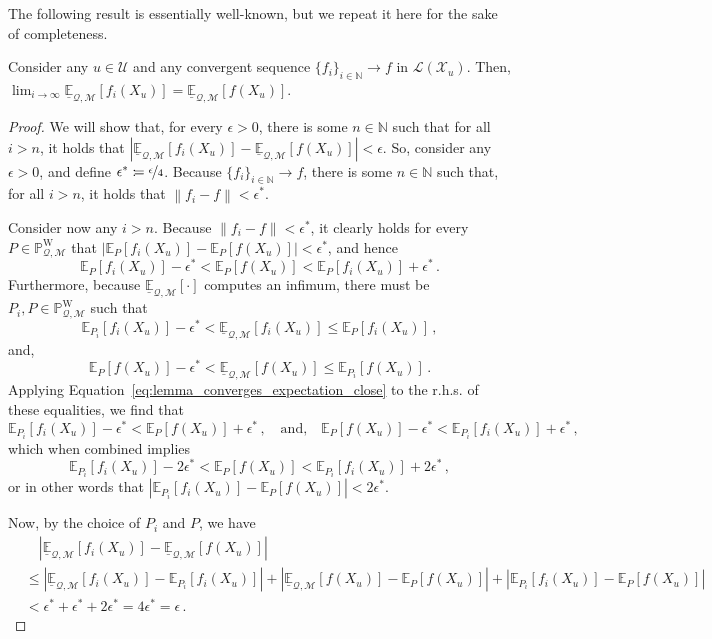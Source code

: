 \documentclass[twoside,11pt]{article}
\newcommand{\nats}{\mathbb{N}}
\newcommand{\states}{\mathcal{X}}
\newcommand{\processes}{\mathbb{P}}
\newcommand{\wprocesses}{\processes^{\mathrm{W}}}
\newcommand{\lexp}{\underline{\mathbb{E}}_{\rateset,\mathcal{M}}}
\newcommand{\gambles}{\mathcal{L}}
\newcommand{\rateset}{\mathcal{Q}}
\newcommand{\norm}[1]{\left\lVert #1 \right\rVert}
\newcommand{\abs}[1]{\left\vert #1 \right\vert}
\newcommand{\coloneqq}{:\!=}
\begin{document}
The following result is essentially well-known, but we repeat it here for the sake of completeness.

\begin{lemma}\label{lemma:limit_lexp_is_lexp_limit}
Consider any $u\in\mathcal{U}$ and any convergent sequence $\{f_i\}_{i\in\nats}\to f$ in $\gambles(\states_u)$. Then, $\lim_{i\to\infty}\lexp[f_i(X_u)]=\lexp[f(X_u)]$.
\end{lemma}
\begin{proof}
We will show that, for every $\epsilon>0$, there is some $n\in\nats$ such that for all $i>n$, it holds that $\abs{\lexp[f_i(X_u)]-\lexp[f(X_u)]} < \epsilon$. So, consider any $\epsilon>0$, and define $\epsilon^*\coloneqq \nicefrac{\epsilon}{4}$. Because $\{f_i\}_{i\in\nats}\to f$, there is some $n\in\nats$ such that, for all $i>n$, it holds that $\norm{f_i - f}<\epsilon^*$. 

Consider now any $i>n$. Because $\norm{f_i - f}<\epsilon^*$, it clearly holds for every $P\in\wprocesses_{\rateset,\mathcal{M}}$ that $\abs{\mathbb{E}_P[f_i(X_u)] - \mathbb{E}_P[f(X_u)]}<\epsilon^*$, and hence
\begin{equation}\label{eq:lemma_converges_expectation_close}
\mathbb{E}_P[f_i(X_u)] - \epsilon^* < \mathbb{E}_P[f(X_u)] < \mathbb{E}_P[f_i(X_u)] + \epsilon^*\,.
\end{equation}
Furthermore, because $\lexp[\cdot]$ computes an infimum, there must be $P_i,P\in\wprocesses_{\rateset,\mathcal{M}}$ such that
\begin{equation*}
\mathbb{E}_{P_i}[f_i(X_u)] - \epsilon^* < \lexp[f_i(X_u)] \leq \mathbb{E}_{P}[f_i(X_u)]\,,
\end{equation*}
and,
\begin{equation*}
\mathbb{E}_{P}[f(X_u)] - \epsilon^* < \lexp[f(X_u)] \leq \mathbb{E}_{P_i}[f(X_u)]\,.
\end{equation*}
Applying Equation~\eqref{eq:lemma_converges_expectation_close} to the r.h.s. of these equalities, we find that
\begin{equation*}
\mathbb{E}_{P_i}[f_i(X_u)] - \epsilon^* < \mathbb{E}_{P}[f(X_u)] + \epsilon^*\,,\quad\text{and,}\quad \mathbb{E}_{P}[f(X_u)] - \epsilon^* < \mathbb{E}_{P_i}[f_i(X_u)] + \epsilon^*\,,
\end{equation*}
which when combined implies
\begin{equation*}
\mathbb{E}_{P_i}[f_i(X_u)] - 2\epsilon^* < \mathbb{E}_{P}[f(X_u)] < \mathbb{E}_{P_i}[f_i(X_u)] + 2\epsilon^*\,,
\end{equation*}
or in other words that $\abs{\mathbb{E}_{P_i}[f_i(X_u)] - \mathbb{E}_{P}[f(X_u)]} < 2\epsilon^*$.

Now, by the choice of $P_i$ and $P$, we have
\begin{align*}
 &\quad \abs{\lexp[f_i(X_u)]-\lexp[f(X_u)]} \\
 &\leq \abs{\lexp[f_i(X_u)] - \mathbb{E}_{P_i}[f_i(X_u)]} + \abs{\lexp[f(X_u)] - \mathbb{E}_{P}[f(X_u)]} + \abs{\mathbb{E}_{P_i}[f_i(X_u)] - \mathbb{E}_{P}[f(X_u)]} \\
 &< \epsilon^* + \epsilon^* + 2\epsilon^* = 4\epsilon^* = \epsilon\,.
\end{align*}
\end{proof}
\end{document}
